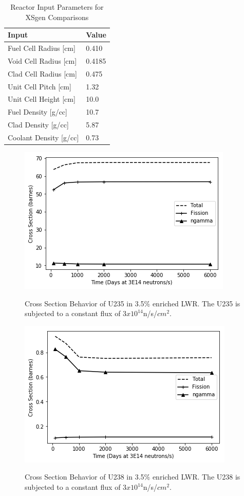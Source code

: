 \documentclass{article}
\begin{document}
\begin{table}[!htb]
\centering
\caption{Reactor Input Parameters for XSgen Comparisons}
\label{tab:xsgenstats1}
\begin{tabular}{|ll|}
\hline
Input & Value \\
\hline
Fuel Cell Radius [cm] & 0.410 \\
Void Cell Radius [cm] & 0.4185 \\
Clad Cell Radius [cm] & 0.475 \\
Unit Cell Pitch  [cm] & 1.32 \\
Unit Cell Height [cm] & 10.0 \\
Fuel Density [g/cc] & 10.7 \\
Clad Density [g/cc] & 5.87 \\
Coolant Density [g/cc] & 0.73 \\
\hline
\end{tabular}
\end{table}

\begin{figure}
\caption{Cross Section Behavior of U235 in 3.5\% enriched LWR.
         The U235 is subjected to a constant flux of $3x10^14$n/s/$cm^2$.}
\includegraphics[scale=0.8]{U235xs.png}
\label{fig:u235xs}
\end{figure}

\begin{figure}
\caption{Cross Section Behavior of U238 in 3.5\% enriched LWR. The U238 is subjected to a constant flux of $3x10^14$n/s/$cm^2$.}
\includegraphics[scale=0.8]{U238xs.png}
\label{fig:u238xs}
\end{figure}
\end{document}
